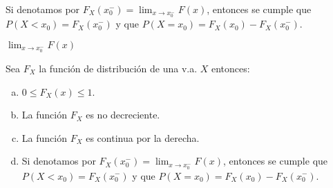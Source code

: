 \documentclass[handout]{beamer}
\begin{document}
\begin{frame}
Si denotamos por $F_X(x_0^{-})=\displaystyle{\lim_{x\to x_0^{-}}} F(x)$,
entonces se cumple que $P(X< x_0)=F_X(x_0^{-})$ y que $P(X=x_0)=F_X(x_0)-F_X(x_0^{-})$.

$\lim_{x\to x_0^{-}} F(x)$
\end{frame}



\begin{frame}

      Sea $F_{X}$ la función de distribución  de una  v.a. $X$ entonces:
\begin{enumerate}[a)]
\item  $0\leq F_{X}(x)\leq 1$.
\item La función $F_{X}$ es no decreciente.
\item La función $F_{X}$ es continua por la derecha.
\item Si denotamos por $F_X(x_0^{-})=\displaystyle{\lim_{x\to x_0^{-}}} F(x)$,
entonces se cumple que $P(X< x_0)=F_X(x_0^{-})$ y que $P(X=x_0)=F_X(x_0)-F_X(x_0^{-})$.
\end{enumerate}
\end{frame}
\end{document}
